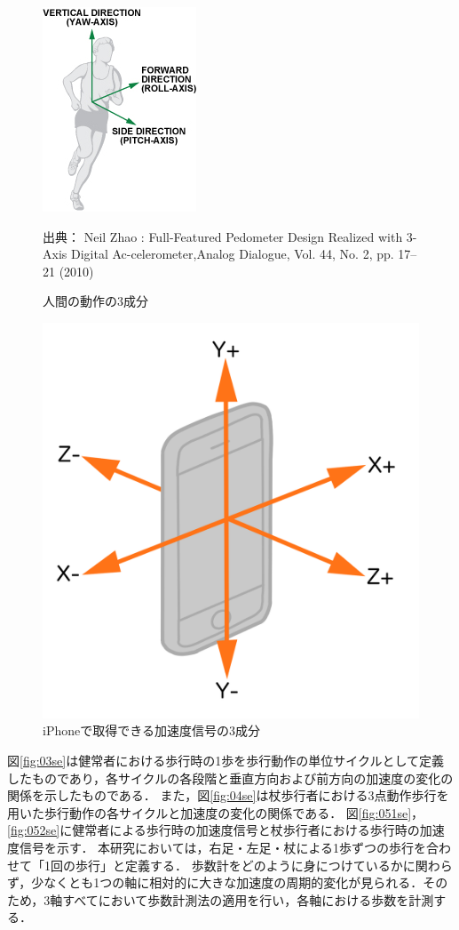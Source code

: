 \begin{figure}[tbhp]
  \begin{center}
  \includegraphics[width=0.4\hsize]{image/Fig-1.jpg}
  \end{center}
  \begin{center}
  出典： Neil Zhao : Full-Featured Pedometer Design Realized with 3-Axis Digital Ac-celerometer,Analog Dialogue, Vol. 44, No. 2, pp. 17–21 (2010)
  \caption{人間の動作の3成分}
  \label{fig:01se}
  \end{center}
\end{figure}
\begin{figure}[tbhp]
  \begin{center}
  \includegraphics[width=0.5\hsize]{image/fig-2.png}
  \caption{iPhoneで取得できる加速度信号の3成分}
  \label{fig:02se}
  \end{center}
\end{figure}


図\ref{fig:03se}は健常者における歩行時の1歩を歩行動作の単位サイクルとして定義したものであり，各サイクルの各段階と垂直方向および前方向の加速度の変化の関係を示したものである．
また，図\ref{fig:04se}は杖歩行者における3点動作歩行を用いた歩行動作の各サイクルと加速度の変化の関係である．
図\ref{fig:051se}，\ref{fig:052se}に健常者による歩行時の加速度信号と杖歩行者における歩行時の加速度信号を示す．
本研究においては，右足・左足・杖による1歩ずつの歩行を合わせて「1回の歩行」と定義する．
歩数計をどのように身につけているかに関わらず，少なくとも1つの軸に相対的に大きな加速度の周期的変化が見られる．そのため，3軸すべてにおいて歩数計測法の適用を行い，各軸における歩数を計測する．

